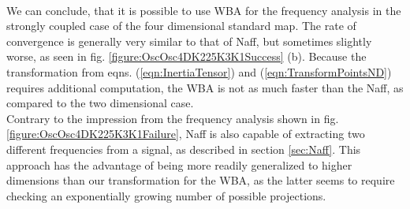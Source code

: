 \\
We can conclude, that it is possible to use WBA for the frequency analysis in the strongly coupled case of the four dimensional standard map. 
The rate of convergence is generally very similar to that of Naff, but sometimes slightly worse, as seen in fig. \ref{figure:OscOsc4DK225K3K1Success} (b). 
Because the transformation from eqns. (\ref{eqn:InertiaTensor}) and (\ref{eqn:TransformPointsND}) requires additional computation, the WBA is not as much faster than the Naff, as compared to the two dimensional case. 
\\
Contrary to the impression from the frequency analysis shown in fig. \ref{figure:OscOsc4DK225K3K1Failure}, Naff is also capable of extracting two different frequencies from a signal, as described in section \ref{sec:Naff}.
This approach has the advantage of being more readily generalized to higher dimensions than our transformation for the WBA, as the latter seems to require checking an exponentially growing number of possible projections.
\FloatBarrier
